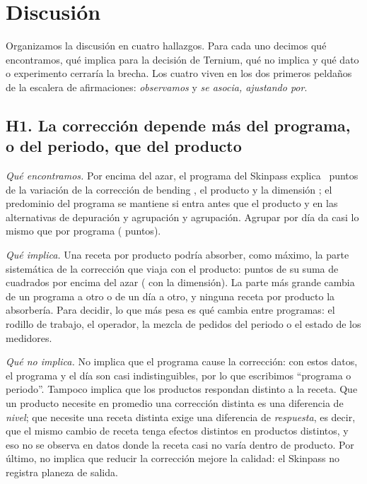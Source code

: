 \section{Discusión}
\label{sec:discusion}

Organizamos la discusión en cuatro hallazgos. Para cada uno decimos qué encontramos, qué implica para la decisión de
Ternium, qué no implica y qué dato o experimento cerraría la brecha. Los cuatro viven en los dos primeros peldaños de
la escalera de afirmaciones: \emph{observamos} y \emph{se asocia, ajustando por}.

\subsection{H1. La corrección depende más del programa, o del periodo, que del producto}
\emph{Qué encontramos.} Por encima del azar, el programa del Skinpass explica \ExcesoPrograma~puntos de la variación de
la corrección de bending \ExcesoProgramaIC, el producto \ExcesoProducto{} \ExcesoProductoIC{} y la dimensión
\ExcesoDimension; el predominio del programa se mantiene si entra antes que el producto y en las \NVariantes{}
alternativas de depuración y agrupación y agrupación. Agrupar por día da casi lo mismo que por programa (\VCuatroExcesoDia{} puntos).

\emph{Qué implica.} Una receta por producto podría absorber, como máximo, la parte sistemática de la corrección que
viaja con el producto: \ExcesoProducto{} puntos de su suma de cuadrados por encima del azar (\ExcesoProdDim{} con la
dimensión). La parte más grande cambia de un programa a otro o de un día a otro, y ninguna receta por producto la
absorbería. Para decidir, lo que más pesa es qué cambia entre programas: el rodillo de trabajo, el operador, la mezcla
de pedidos del periodo o el estado de los medidores.

\emph{Qué no implica.} No implica que el programa cause la corrección: con estos datos, el programa y el día son casi
indistinguibles, por lo que escribimos ``programa o periodo''. Tampoco implica que los productos respondan distinto a la
receta. Que un producto necesite en promedio una corrección distinta es una diferencia de \emph{nivel}; que necesite
una receta distinta exige una diferencia de \emph{respuesta}, es decir, que el mismo cambio de receta tenga efectos
distintos en productos distintos, y eso no se observa en datos donde la receta casi no varía dentro de producto. Por
último, no implica que reducir la corrección mejore la calidad: el Skinpass no registra planeza de salida.

